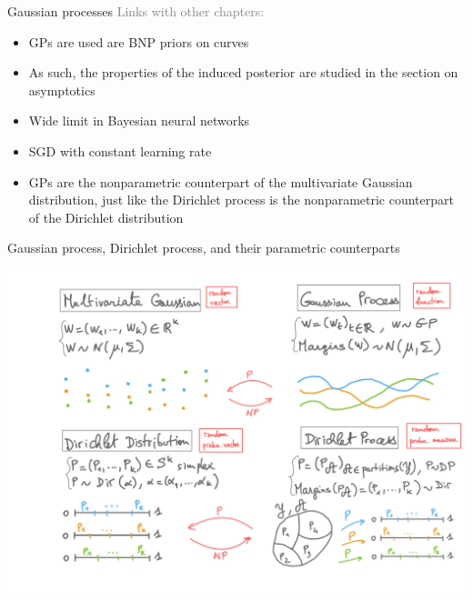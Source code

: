\begin{frame}{Gaussian processes}
\textcolor{gray}{Links with other chapters:}
\begin{itemize}
	\item GPs are used are \alert{BNP priors} on curves
	\item As such, the properties of the induced posterior are studied in the section on  \alert{asymptotics}
	\item Wide limit in  \alert{Bayesian neural networks}
	\item  \alert{SGD} with constant learning rate
	\item GPs are the nonparametric counterpart of the \alert{multivariate Gaussian distribution}, just like the \alert{Dirichlet process} is the nonparametric counterpart of the \alert{Dirichlet distribution}
\end{itemize}
\end{frame}


\begin{frame}{Gaussian process, Dirichlet process, and their parametric counterparts}
	\begin{center}
		\includegraphics[width=\textwidth]{figures_julyan/gp/gp-and-dp.pdf}
	\end{center}
\end{frame}



